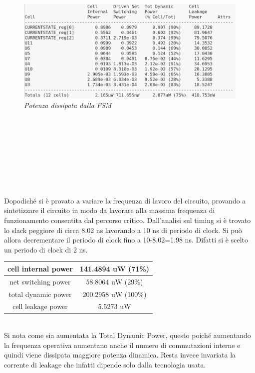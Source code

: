 \\
\begin{figure}[!htb]
	\centering
	\includegraphics[scale=0.6]{immagini/fsm_power_cell}
	\caption{\textit{Potenza dissipata dalla FSM}}
	\label{datapath}
\end{figure} \\
\\
\\
\\
\\
\\
\\
\\
Dopodiché si è provato a variare la frequenza di lavoro del circuito, provando a sintetizzare il circuito in modo da lavorare alla massima frequenza di funzionamento consentita dal percorso critico. Dall’analisi sul timing si è trovato lo slack peggiore di circa 8.02 ns  lavorando a 10 ns di periodo di clock. Si può allora decrementare il periodo di clock fino a 10-8.02=1.98 ns. Difatti si è scelto un periodo di clock di 2 ns.
\\
\begin{table}[!h]\footnotesize
	\centering
	\begin{tabular}{|c|c|}
		\hline
		cell internal power & 141.4894 uW (71\%)\\
		\hline
		net switching power & 58.8064 uW (29\%)\\
		\hline
		\hline
		total dynamic power & 200.2958 uW (100\%)\\
		\hline
		cell leakage power & 5.5273 uW\\
		\hline
	\end{tabular}
\end{table} \\
 Si nota come sia aumentata la Total Dynamic Power, questo poiché aumentando la frequenza operativa aumentano anche il numero di commutazioni interne e quindi viene dissipata maggiore potenza dinamica. Resta invece invariata la corrente di leakage che infatti dipende solo dalla tecnologia usata.

